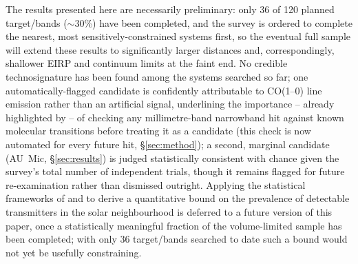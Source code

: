 \documentclass{openjournal}
\begin{document}
The results presented here are necessarily preliminary: only 36 of 120
planned target/bands ($\sim$30\%) have been completed, and the survey is
ordered to complete the nearest, most sensitively-constrained systems
first, so the eventual full sample will extend these results to
significantly larger distances and, correspondingly, shallower EIRP and
continuum limits at the faint end. No credible technosignature has been
found among the systems searched so far; one automatically-flagged
candidate is confidently attributable to CO(1--0) line emission rather
than an artificial signal, underlining the importance -- already
highlighted by \citet{Mason2024} -- of checking any millimetre-band
narrowband hit against known molecular transitions before treating it as
a candidate (this check is now automated for every future hit,
\S\ref{sec:method}); a second, marginal candidate (AU~Mic,
\S\ref{sec:results}) is judged statistically consistent with chance
given the survey's total number of independent trials, though it remains
flagged for future re-examination rather than dismissed outright.
Applying the statistical frameworks of
\citet{Wright2018} and \citet{Margot2023} to derive a quantitative bound
on the prevalence of detectable transmitters in the solar neighbourhood
is deferred to a future version of this paper, once a statistically
meaningful fraction of the volume-limited sample has been completed;
with only 36 target/bands searched to date such a bound would not yet be
usefully constraining.
\end{document}
